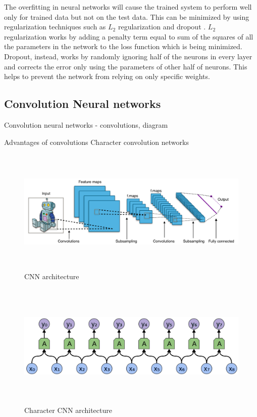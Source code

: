 \documentclass[a4paper, 11pt]{article}
\begin{document}
The overfitting in neural networks will cause the trained system to perform well only for trained data but not on the test data. This can be minimized by using regularization techniques such as $L_2$ regularization and dropout \parencite{Hinton2012}. $L_2$ regularization works by adding a penalty term equal to sum of the squares of all the parameters in the network to the loss function which is being minimized. Dropout, instead, works by randomly ignoring half of the neurons in every layer and corrects the error only using the parameters of other half of neurons. This helps to prevent the network from relying on only specific weights.

\subsection{Convolution Neural networks}

Convolution neural networks - convolutions, diagram
\parencite{lecun-bengio-95a}

Advantages of convolutions
Character convolution networks \parencite{Zhang2015}

\begin{figure}[H]
    \centering
    \includegraphics[width=\textwidth,height=6cm,keepaspectratio=true]
    {cnn-1.png}
    \caption{
        CNN architecture \parencite{cnn-1}
    }
    \label{fig:CNN architecture}
\end{figure}

\begin{figure}[H]
    \centering
    \includegraphics[width=\textwidth,height=6cm,keepaspectratio=true]
    {cnn-2.png}
    \caption{
        Character CNN architecture
    }
    \label{fig:CNN architecture}
\end{figure}
\end{document}
